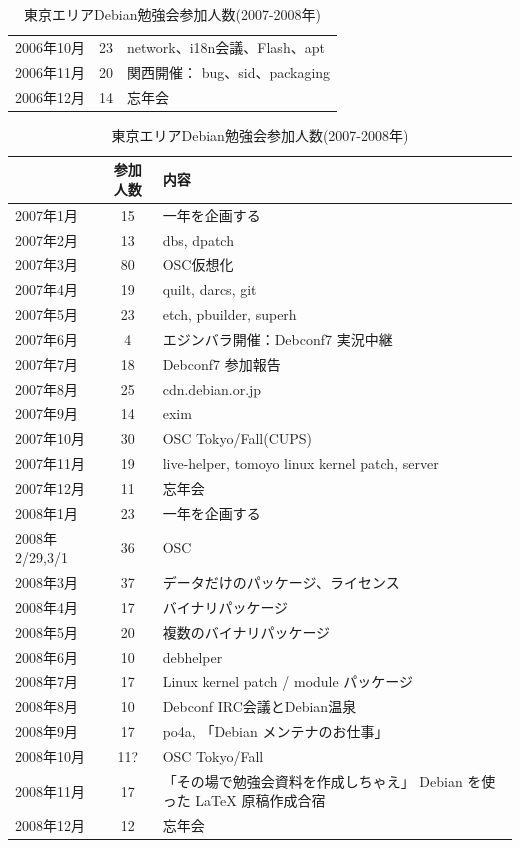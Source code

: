 \documentclass[mingoth,a4paper]{jsarticle}
\begin{document}
\begin{table}[ht]
\begin{minipage}{0.5\hsize}
\begin{center}
\begin{tabular}{|l|c|p{10em}|}
   2006年10月 & 23 & network、i18n会議、Flash、apt \\
   2006年11月 & 20 & 関西開催： bug、sid、packaging \\
   2006年12月 & 14 & 忘年会 \\
 \hline
  \end{tabular}
 \end{center}
\end{minipage}
\begin{minipage}{0.5\hsize}
 \caption{東京エリアDebian勉強会参加人数(2007-2008年)}\label{tab:count2007}
 \begin{center}
  \begin{tabular}{|l|c|p{10em}|}
 \hline
 & 参加人数 & 内容\\
 \hline
   2007年1月 & 15 & 一年を企画する \\
   2007年2月 & 13 & dbs, dpatch\\ 
   2007年3月 & 80 & OSC仮想化 \\
   2007年4月 & 19 & quilt, darcs, git\\
   2007年5月 & 23 & etch, pbuilder, superh \\   
   2007年6月 & 4 & エジンバラ開催：Debconf7 実況中継 \\
   2007年7月 & 18 & Debconf7 参加報告\\
   2007年8月 & 25 & cdn.debian.or.jp \\   
   2007年9月 & 14 & exim \\   
   2007年10月 & 30 & OSC Tokyo/Fall(CUPS) \\   
   2007年11月 & 19 & live-helper, tomoyo linux kernel patch, server\\
   2007年12月 & 11 & 忘年会\\
   2008年1月 & 23 & 一年を企画する \\
   2008年2/29,3/1 & 36 & OSC  \\
   2008年3月 & 37 & データだけのパッケージ、ライセンス \\
   2008年4月 & 17 & バイナリパッケージ \\
   2008年5月 & 20 & 複数のバイナリパッケージ \\
   2008年6月 & 10 & debhelper \\
   2008年7月 & 17 & Linux kernel patch / module パッケージ \\
   2008年8月 & 10 & Debconf IRC会議とDebian温泉 \\
   2008年9月 & 17 & po4a, 「Debian メンテナのお仕事」 \\
   2008年10月 & 11? & OSC Tokyo/Fall \\
   2008年11月 & 17 & 「その場で勉強会資料を作成しちゃえ」 Debian を使った \LaTeX{} 原稿作成合宿 \\
   2008年12月 & 12 & 忘年会 \\
 \hline
  \end{tabular}
 \end{center}
\end{minipage}
\end{table}
\end{document}
